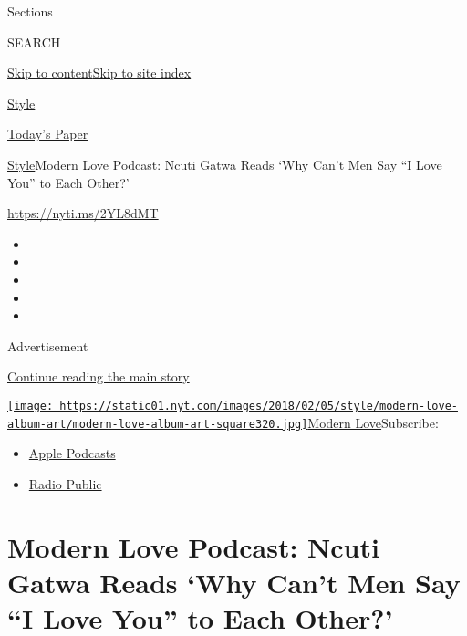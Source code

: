 Sections

SEARCH

\protect\hyperlink{site-content}{Skip to
content}\protect\hyperlink{site-index}{Skip to site index}

\href{https://www.nytimes.com/section/style}{Style}

\href{https://myaccount.nytimes.com/auth/login?response_type=cookie\&client_id=vi}{}

\href{https://www.nytimes.com/section/todayspaper}{Today's Paper}

\href{/section/style}{Style}\textbar{}Modern Love Podcast: Ncuti Gatwa
Reads `Why Can't Men Say ``I Love You'' to Each Other?'

\url{https://nyti.ms/2YL8dMT}

\begin{itemize}
\item
\item
\item
\item
\item
\end{itemize}

Advertisement

\protect\hyperlink{after-top}{Continue reading the main story}

\href{https://www.nytimes.com/column/modern-love-podcast}{\texttt{[image: https://static01.nyt.com/images/2018/02/05/style/modern-love-album-art/modern-love-album-art-square320.jpg]}Modern
Love}Subscribe:

\begin{itemize}
\tightlist
\item
  \href{https://itunes.apple.com/us/podcast/id1065559535}{Apple
  Podcasts}
\item
  \href{https://play.radiopublic.com/modern-love-k6pYB8}{Radio Public}
\end{itemize}

\hypertarget{modern-love-podcast-ncuti-gatwa-reads-why-cant-men-say-i-love-you-to-each-other}{%
\section{Modern Love Podcast: Ncuti Gatwa Reads `Why Can't Men Say ``I
Love You'' to Each
Other?'}\label{modern-love-podcast-ncuti-gatwa-reads-why-cant-men-say-i-love-you-to-each-other}}

\subsection{}

